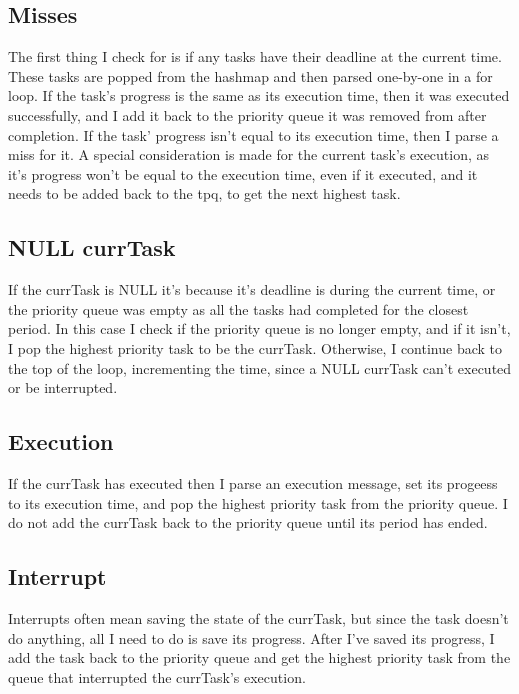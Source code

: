 \documentclass{article}
\begin{document}
    \subsection{Misses}
    The first thing I check for is if any tasks have their deadline at the current time. \newline
    These tasks are popped from the hashmap and then parsed one-by-one in a for loop. \newline
    If the task's progress is the same as its execution time, then it was executed successfully, and I add it back to the priority queue it was removed from after completion. \newline
    If the task' progress isn't equal to its execution time, then I parse a miss for it. \newline
    A special consideration is made for the current task's execution, as it's progress won't be equal to the execution time, even if it executed, and it needs to be added back to the tpq, to get the next highest task. \newline
    \subsection{NULL currTask}
    If the currTask is NULL it's because it's deadline is during the current time, or the priority queue was empty as all the tasks had completed for the closest period. \newline
    In this case I check if the priority queue is no longer empty, and if it isn't, I pop the highest priority task to be the currTask. \newline
    Otherwise, I continue back to the top of the loop, incrementing the time, since a NULL currTask can't executed or be interrupted. 
    \subsection{Execution}
    If the currTask has executed then I parse an execution message, set its progeess to its execution time, and pop the highest priority task from the priority queue. \newline
    I do not add the currTask back to the priority queue until its period has ended. 
    \subsection{Interrupt}
    Interrupts often mean saving the state of the currTask, but since the task doesn't do anything, all I need to do is save its progress. \newline
    After I've saved its progress, I add the task back to the priority queue and get the highest priority task from the queue that interrupted the currTask's execution.
\end{document}
